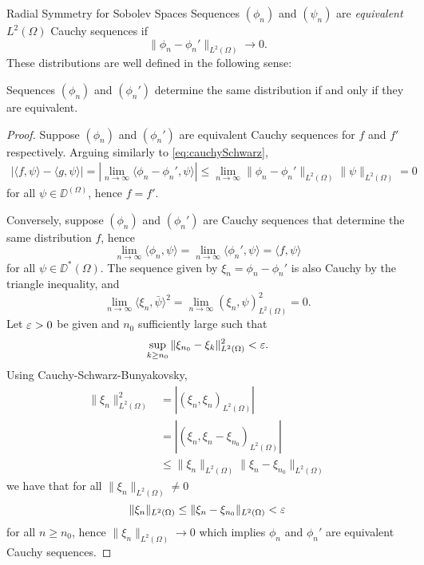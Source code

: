 \begin{chapter}{Radial Symmetry for Sobolev Spaces}
Sequences $(\phi_n)$ and $(\psi_n)$ are \emph{equivalent} $L^2(\Omega)$ Cauchy sequences if
\begin{equation}\label{eq:cauchyEquivalence}
  \|\phi_n - \phi_n'\|_{L^2(\Omega)} \to 0.
\end{equation}
These distributions are well defined in the following sense: 
\begin{prop} \label{prop:cauchyCorrespondence}
  Sequences $(\phi_n)$ and $(\phi_n')$ determine the same distribution if and only if they are equivalent.
\end{prop}
\begin{proof}
  Suppose $(\phi_n)$ and $(\phi_n')$ are equivalent Cauchy sequences for $f$ and $f'$ respectively.
  Arguing similarly to \eqref{eq:cauchySchwarz},
  \begin{align} 
    |\langle f, \psi\rangle - \langle g, \psi\rangle| = \left|\lim_{n\to \infty}\langle \phi_n - \phi_n', \psi\rangle\right| \le \lim_{n\to\infty}\|\phi_n - \phi_n'\|_{L^2(\Omega)}\|\psi\|_{L^2(\Omega)} =  0
  \end{align} 
  for all $\psi \in \DD^(\Omega)$, hence $f = f'$.

  Conversely, suppose $(\phi_n)$ and $(\phi_n')$ are Cauchy sequences that determine the same distribution $f$, hence
  \begin{equation}
    \lim_{n\to\infty} \langle \phi_n,\psi\rangle = \lim_{n\to\infty} \langle \phi_n',\psi\rangle = \langle f,\psi\rangle
  \end{equation}
  for all $\psi \in \DD^*(\Omega)$.
  The sequence given by $\xi_n = \phi_n - \phi_n'$ is also Cauchy by the triangle inequality, and 
  \begin{equation}
    \lim_{n\to\infty}\langle \xi_n,\bar{\psi}\rangle^2 = \lim_{n\to\infty} (\xi_n,\psi)_{L^2(\Omega)}^2 = 0.
  \end{equation}
  Let $\varepsilon >0$ be given and $n_0$ sufficiently large such that 
  \begin{equation}
    \sup_{k\ge n_0} \|\xi_{n_0} - \xi_k\|_{L^2(\Omega)}^2 < \varepsilon.
  \end{equation}
  Using Cauchy-Schwarz-Bunyakovsky,
  \begin{align}
    \|\xi_n\|_{L^2(\Omega)}^2 
      &= |(\xi_n,\xi_n)_{L^2(\Omega)}| \nonumber\\
      &= |(\xi_n,\xi_n - \xi_{n_0})_{L^2(\Omega)}| \nonumber\\
      &\le \|\xi_n\|_{L^2(\Omega)}\|\xi_n-\xi_{n_0}\|_{L^2(\Omega)}
  \end{align}
  we have that for all $\|\xi_n\|_{L^2(\Omega)} \not= 0$
  \begin{equation}
    \|\xi_n\|_{L^2(\Omega)} \le \|\xi_n - \xi_{n_0}\|_{L^2(\Omega)} < \varepsilon
  \end{equation}
  for all $n \ge n_0$, hence $\|\xi_n\|_{L^2(\Omega)} \to 0$ which implies $\phi_n$ and $\phi_n'$ are equivalent Cauchy sequences.
\end{proof}


\end{chapter}
